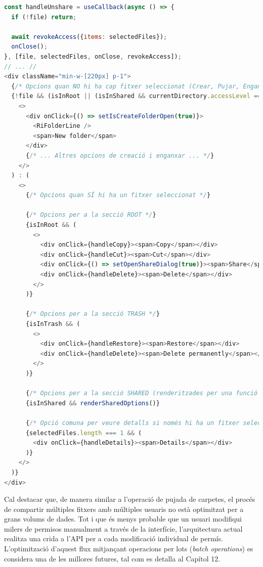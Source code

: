 \begin{lstlisting}[language=javascript, caption={Renderitzat condicional de les opcions del menú a `FileManagerContextMenu/index.tsx`}]
const handleUnshare = useCallback(async () => {
  if (!file) return;
  
  await revokeAccess({items: selectedFiles});
  onClose();
}, [file, selectedFiles, onClose, revokeAccess]);
// ... //
<div className="min-w-[220px] p-1">
  {/* Opcions quan NO hi ha cap fitxer seleccionat (Crear, Pujar, Enganxar...) */}
  {!file && (isInRoot || (isInShared && currentDirectory.accessLevel === 'WRITE')) ? (
    <>
      <div onClick={() => setIsCreateFolderOpen(true)}>
        <RiFolderLine />
        <span>New folder</span>
      </div>
      {/* ... Altres opcions de creació i enganxar ... */}
    </>
  ) : (
    <>
      {/* Opcions quan SÍ hi ha un fitxer seleccionat */}

      {/* Opcions per a la secció ROOT */}
      {isInRoot && (
        <>
          <div onClick={handleCopy}><span>Copy</span></div>
          <div onClick={handleCut}><span>Cut</span></div>
          <div onClick={() => setOpenShareDialog(true)}><span>Share</span></div>
          <div onClick={handleDelete}><span>Delete</span></div>
        </>
      )}

      {/* Opcions per a la secció TRASH */}
      {isInTrash && (
        <>
          <div onClick={handleRestore}><span>Restore</span></div>
          <div onClick={handleDelete}><span>Delete permanently</span></div>
        </>
      )}
      
      {/* Opcions per a la secció SHARED (renderitzades per una funció auxiliar) */}
      {isInShared && renderSharedOptions()}

      {/* Opció comuna per veure detalls si només hi ha un fitxer seleccionat */}
      {selectedFiles.length === 1 && (
        <div onClick={handleDetails}><span>Details</span></div>
      )}
    </>
  )}
</div>
\end{lstlisting}

Cal destacar que, de manera similar a l'operació de pujada de carpetes, el procés de compartir múltiples fitxers amb múltiples usuaris no està optimitzat per a grans volums de dades. Tot i que és menys probable que un usuari modifiqui milers de permisos manualment a través de la interfície, l'arquitectura actual realitza una crida a l'API per a cada modificació individual de permís. L'optimització d'aquest flux mitjançant operacions per lots (\textit{batch operations}) es considera una de les millores futures, tal com es detalla al Capítol 12.
